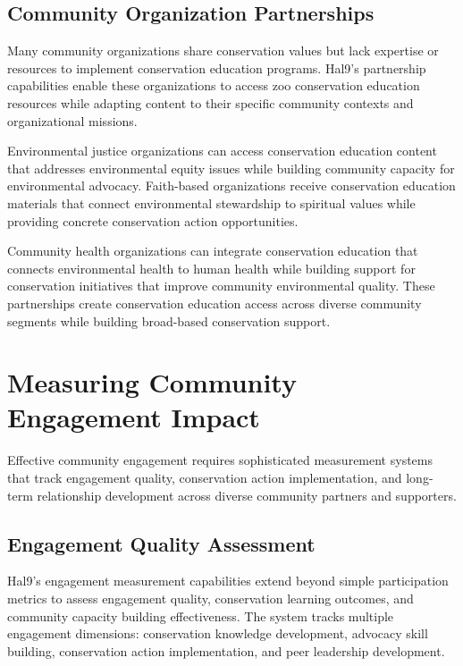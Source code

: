 \documentclass[
  Letterpaper,
]{scrbook}
\begin{document}
\subsection{Community Organization
Partnerships}\label{community-organization-partnerships}

Many community organizations share conservation values but lack
expertise or resources to implement conservation education programs.
Hal9's partnership capabilities enable these organizations to access zoo
conservation education resources while adapting content to their
specific community contexts and organizational missions.

Environmental justice organizations can access conservation education
content that addresses environmental equity issues while building
community capacity for environmental advocacy. Faith-based organizations
receive conservation education materials that connect environmental
stewardship to spiritual values while providing concrete conservation
action opportunities.

Community health organizations can integrate conservation education that
connects environmental health to human health while building support for
conservation initiatives that improve community environmental quality.
These partnerships create conservation education access across diverse
community segments while building broad-based conservation support.

\section{Measuring Community Engagement
Impact}\label{measuring-community-engagement-impact}

Effective community engagement requires sophisticated measurement
systems that track engagement quality, conservation action
implementation, and long-term relationship development across diverse
community partners and supporters.

\subsection{Engagement Quality
Assessment}\label{engagement-quality-assessment}

Hal9's engagement measurement capabilities extend beyond simple
participation metrics to assess engagement quality, conservation
learning outcomes, and community capacity building effectiveness. The
system tracks multiple engagement dimensions: conservation knowledge
development, advocacy skill building, conservation action
implementation, and peer leadership development.
\end{document}
